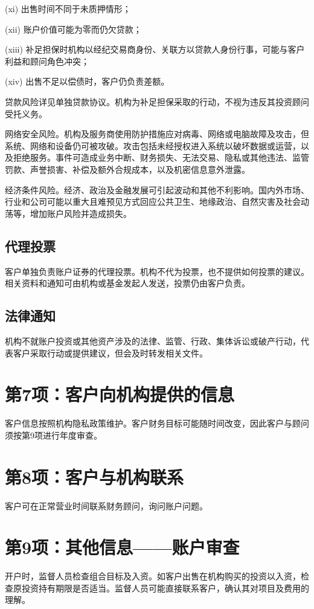 \documentclass[UTF8,fontset=none,11pt,a4paper]{ctexart}
\begin{document}
(xi) 出售时间不同于未质押情形；


(xii) 账户价值可能为零而仍欠贷款；


(xiii) 补足担保时机构以经纪交易商身份、关联方以贷款人身份行事，可能与客户利益和顾问角色冲突；


(xiv) 出售不足以偿债时，客户仍负责差额。


贷款风险详见单独贷款协议。机构为补足担保采取的行动，不视为违反其投资顾问受托义务。


网络安全风险。机构及服务商使用防护措施应对病毒、网络或电脑故障及攻击，但系统、网络和设备仍可被攻破。攻击包括未经授权进入系统以破坏数据或运营，以及拒绝服务。事件可造成业务中断、财务损失、无法交易、隐私或其他违法、监管罚款、声誉损害、补偿及额外合规成本，以及机密信息意外泄露。


经济条件风险。经济、政治及金融发展可引起波动和其他不利影响。国内外市场、行业和公司可能以重大且难预见方式回应公共卫生、地缘政治、自然灾害及社会动荡等，增加账户风险并造成损失。


\subsection*{代理投票}
客户单独负责账户证券的代理投票。机构不代为投票，也不提供如何投票的建议。相关资料和通知可由机构或基金发起人发送，投票仍由客户负责。


\subsection*{法律通知}
机构不就账户投资或其他资产涉及的法律、监管、行政、集体诉讼或破产行动，代表客户采取行动或提供建议，但会及时转发相关文件。


\section*{第7项：客户向机构提供的信息}
客户信息按照机构隐私政策维护。客户财务目标可能随时间改变，因此客户与顾问须按第9项进行年度审查。


\section*{第8项：客户与机构联系}
客户可在正常营业时间联系财务顾问，询问账户问题。


\section*{第9项：其他信息——账户审查}
开户时，监督人员检查组合目标及入资。如客户出售在机构购买的投资以入资，检查原投资持有期限是否适当。监督人员可能直接联系客户，确认其对项目及费用的理解。
\end{document}

